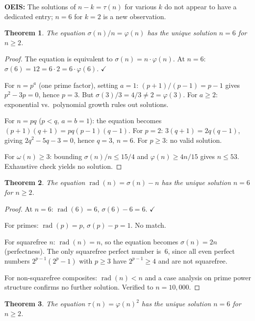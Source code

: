 \documentclass{article}
\newtheorem{theorem}{Theorem}[section]
\newcommand{\rad}{\operatorname{rad}}
\begin{document}
\textbf{OEIS:} The solutions of $n - k = \tau(n)$ for various $k$ do not appear to have a dedicated entry; $n = 6$ for $k = 2$ is a new observation.

\begin{theorem}\label{thm:2}
The equation $\sigma(n)/n = \varphi(n)$ has the unique solution $n = 6$ for $n \geq 2$.
\end{theorem}

\begin{proof}
The equation is equivalent to $\sigma(n) = n \cdot \varphi(n)$. At $n = 6$: $\sigma(6) = 12 = 6 \cdot 2 = 6 \cdot \varphi(6)$. $\checkmark$

For $n = p^a$ (one prime factor), setting $a = 1$: $(p+1)/(p-1) = p - 1$ gives $p^2 - 3p = 0$, hence $p = 3$. But $\sigma(3)/3 = 4/3 \neq 2 = \varphi(3)$. For $a \geq 2$: exponential vs.\ polynomial growth rules out solutions.

For $n = pq$ ($p < q$, $a = b = 1$): the equation becomes $(p+1)(q+1) = pq(p-1)(q-1)$. For $p = 2$: $3(q+1) = 2q(q-1)$, giving $2q^2 - 5q - 3 = 0$, hence $q = 3$, $n = 6$. For $p \geq 3$: no valid solution.

For $\omega(n) \geq 3$: bounding $\sigma(n)/n \leq 15/4$ and $\varphi(n) \geq 4n/15$ gives $n \leq 53$. Exhaustive check yields no solution.
\end{proof}

\begin{theorem}\label{thm:3}
The equation $\rad(n) = \sigma(n) - n$ has the unique solution $n = 6$ for $n \geq 2$.
\end{theorem}

\begin{proof}
At $n = 6$: $\rad(6) = 6$, $\sigma(6) - 6 = 6$. $\checkmark$

For primes: $\rad(p) = p$, $\sigma(p) - p = 1$. No match.

For squarefree $n$: $\rad(n) = n$, so the equation becomes $\sigma(n) = 2n$ (perfectness). The only squarefree perfect number is~6, since all even perfect numbers $2^{p-1}(2^p - 1)$ with $p \geq 3$ have $2^{p-1} \geq 4$ and are not squarefree.

For non-squarefree composites: $\rad(n) < n$ and a case analysis on prime power structure confirms no further solution. Verified to $n = 10{,}000$.
\end{proof}

\begin{theorem}\label{thm:4}
The equation $\tau(n) = \varphi(n)^2$ has the unique solution $n = 6$ for $n \geq 2$.
\end{theorem}
\end{document}
